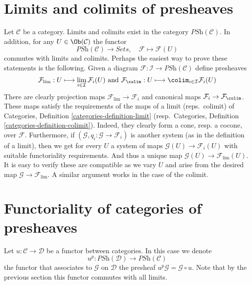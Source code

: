 \section{Limits and colimits of presheaves}
\label{section-limits-colimits-PSh}

\noindent
Let $\mathcal{C}$ be a category.
Limits and colimits exist in the category
$\textit{PSh}(\mathcal{C})$. In addition, for any
$U \in \Ob(\mathcal{C})$ the functor
$$
\textit{PSh}(\mathcal{C})
\longrightarrow
\textit{Sets}, \quad
\mathcal{F}
\longmapsto
\mathcal{F}(U)
$$
commutes with limits and colimits. Perhaps the easiest way to prove
these statements is the following. Given a diagram
$
\mathcal{F} :
\mathcal{I}
\to
\textit{PSh}(\mathcal{C})
$
define presheaves
$$
\mathcal{F}_{\lim} :
U
\longmapsto
\lim_{i \in \mathcal{I}} \mathcal{F}_i(U)
\text{  and  }
\mathcal{F}_{\colim} :
U
\longmapsto
\colim_{i \in \mathcal{I}} \mathcal{F}_i(U)
$$
There are clearly projection maps $\mathcal{F}_{\lim} \to \mathcal{F}_i$
and canonical maps $\mathcal{F}_i \to \mathcal{F}_{\colim}$. These
maps satisfy the requirements of the maps of a limit (reps.\ colimit)
of Categories, Definition \ref{categories-definition-limit}
(resp.\ Categories, Definition \ref{categories-definition-colimit}).
Indeed, they clearly form a cone, resp. a cocone, over $\mathcal{F}$.
Furthermore, if $(\mathcal{G}, q_i : \mathcal{G} \to \mathcal{F}_i)$
is another
system (as in the definition of a limit), then we get for every
$U$ a system of maps $\mathcal{G}(U) \to \mathcal{F}_i(U)$
with suitable functoriality requirements. And thus a unique
map $\mathcal{G}(U) \to \mathcal{F}_{\lim}(U)$. It is easy
to verify these are compatible  as we vary $U$ and arise from
the desired map $\mathcal{G} \to \mathcal{F}_{\lim}$.
A similar argument works in the case of the colimit.





















\section{Functoriality of categories of presheaves}
\label{section-functoriality-PSh}

\noindent
Let $u : \mathcal{C} \to \mathcal{D}$ be a functor between categories.
In this case we denote
$$
u^p :
\textit{PSh}(\mathcal{D})
\longrightarrow
\textit{PSh}(\mathcal{C})
$$
the functor that associates to $\mathcal{G}$ on $\mathcal{D}$ the presheaf
$u^p\mathcal{G} = \mathcal{G} \circ u$. Note that by the previous section
this functor commutes with all limits.

